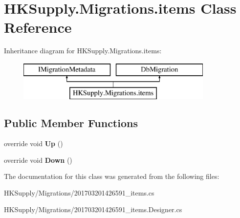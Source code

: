 \hypertarget{class_h_k_supply_1_1_migrations_1_1items}{}\section{H\+K\+Supply.\+Migrations.\+items Class Reference}
\label{class_h_k_supply_1_1_migrations_1_1items}
Inheritance diagram for H\+K\+Supply.\+Migrations.\+items\+:\begin{figure}[H]
\begin{center}
\leavevmode
\includegraphics[height=2.000000cm]{class_h_k_supply_1_1_migrations_1_1items}
\end{center}
\end{figure}
\subsection*{Public Member Functions}
\begin{DoxyCompactItemize}
\item 
\mbox{\label{class_h_k_supply_1_1_migrations_1_1items_a22ec36d158dc54a9f677605e04a873c7}} 
override void {\bfseries Up} ()
\item 
\mbox{\label{class_h_k_supply_1_1_migrations_1_1items_a0c4382c0ee908e75cf4169126b55c9ec}} 
override void {\bfseries Down} ()
\end{DoxyCompactItemize}


The documentation for this class was generated from the following files\+:\begin{DoxyCompactItemize}
\item 
H\+K\+Supply/\+Migrations/201703201426591\+\_\+items.\+cs\item 
H\+K\+Supply/\+Migrations/201703201426591\+\_\+items.\+Designer.\+cs\end{DoxyCompactItemize}
